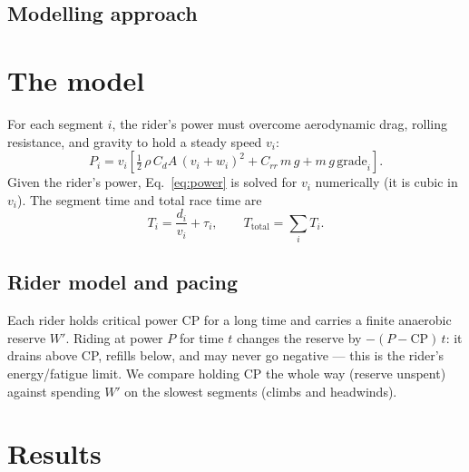 \documentclass[11pt]{article}
\begin{document}
\subsection{Modelling approach}

\section{The model}

For each segment $i$, the rider's power must overcome aerodynamic drag, rolling
resistance, and gravity to hold a steady speed $v_i$:
\begin{equation}
P_i = v_i\!\left[\tfrac{1}{2}\,\rho\,C_dA\,(v_i + w_i)^2 + C_{rr}\,m\,g + m\,g\,\mathrm{grade}_i\right].
\label{eq:power}
\end{equation}
Given the rider's power, Eq.~\eqref{eq:power} is solved for $v_i$ numerically
(it is cubic in $v_i$). The segment time and total race time are
\begin{equation}
T_i = \frac{d_i}{v_i} + \tau_i, \qquad
T_{\mathrm{total}} = \sum_i T_i .
\label{eq:time}
\end{equation}

\subsection{Rider model and pacing}
Each rider holds critical power $\mathrm{CP}$ for a long time and carries a
finite anaerobic reserve $W'$. Riding at power $P$ for time $t$ changes the
reserve by $-(P-\mathrm{CP})\,t$: it drains above CP, refills below, and may
never go negative --- this is the rider's energy/fatigue limit. We compare
holding CP the whole way (reserve unspent) against spending $W'$ on the slowest
segments (climbs and headwinds).

\section{Results}
\end{document}
